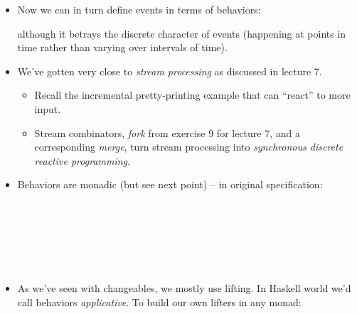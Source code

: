 \documentclass{beamer}
\newcommand{\tmem}[1]{{\em #1\/}}
\begin{document}
\begin{itemize}
  \item Now we can in turn define events in terms of behaviors:
  
  {}{}{\hlopt{= }}{}{}{}{\hlendline{}}
  
  although it betrays the discrete character of events (happening at points in
  time rather than varying over intervals of time).
  
  \item We've gotten very close to {\tmem{stream processing}} as discussed in
  lecture 7.
  \begin{itemize}
    \item Recall the incremental pretty-printing example that can ``react'' to
    more input.
    
    \item Stream combinators, {\tmem{fork}} from exercise 9 for lecture 7, and
    a corresponding {\tmem{merge}}, turn stream processing into
    {\tmem{synchronous discrete reactive programming}}.
  \end{itemize}
  \item Behaviors are monadic (but see next point) -- in original
  specification:
  
  {}{}{\hlopt{= }}{}{\hlopt{->
  }}{}{\hlendline{}}\\
  {}{}{\hlopt{: }}{}{\hlopt{->
  }}{}{\hlendline{}}\\
  {}{}{\hlopt{= }}{}{\hlstd{{\textunderscore} }}{\hlopt{-> }}{}{\hlendline{}}\\
  {}{}{\hlopt{:}}{\hlendline{}}\\
  {}{\hlopt{-> (}}{}{\hlopt{-> }}{}{\hlopt{) -> }}{}{\hlendline{}}\\
  {}{}{\hlopt{= }}{}{}{\hlopt{-> }}{}{\hlopt{(}}{}{\hlopt{)
  }}{}{\hlendline{}}
  
  \item As we've seen with changeables, we mostly use lifting. In Haskell
  world we'd call behaviors {\tmem{applicative}}. To build our own lifters in
  any monad:
  

\end{itemize}
\end{document}
